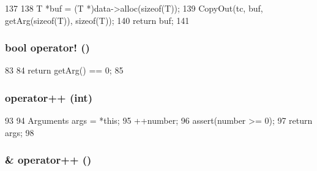 \begin{DoxyCode}
137                    {
138         T *buf = (T *)data->alloc(sizeof(T));
139         CopyOut(tc, buf, getArg(sizeof(T)), sizeof(T));
140         return buf;
141     }
\end{DoxyCode}
\hypertarget{classArguments_acc67790b71a4b793f60cb9b4c56e7355}{
\subsubsection[{operator!}]{\setlength{\rightskip}{0pt plus 5cm}bool operator! ()}}
\label{classArguments_acc67790b71a4b793f60cb9b4c56e7355}



\begin{DoxyCode}
83                      {
84         return getArg() == 0;
85     }
\end{DoxyCode}
\hypertarget{classArguments_a89b47778ded0b48b91cb2025d36d8068}{
\subsubsection[{operator++}]{ operator++ (int)}}
\label{classArguments_a89b47778ded0b48b91cb2025d36d8068}



\begin{DoxyCode}
93                               {
94         Arguments args = *this;
95         ++number;
96         assert(number >= 0);
97         return args;
98     }
\end{DoxyCode}
\hypertarget{classArguments_aad546de7e6f8d7dd08ef30ff0d636c5b}{
\subsubsection[{operator++}]{\& operator++ ()}}
\label{classArguments_aad546de7e6f8d7dd08ef30ff0d636c5b}



